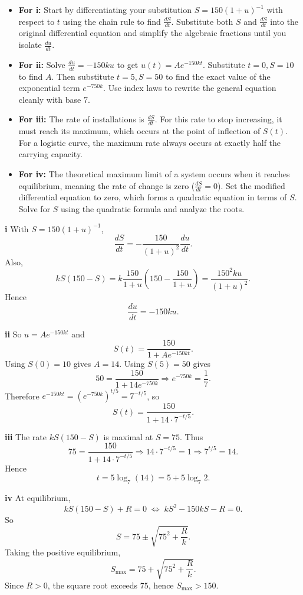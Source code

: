 \begin{hint}
\begin{itemize}
    \item \textbf{For i:} Start by differentiating your substitution $S = 150(1+u)^{-1}$ with respect to $t$ using the chain rule to find $\frac{dS}{dt}$. Substitute both $S$ and $\frac{dS}{dt}$ into the original differential equation and simplify the algebraic fractions until you isolate $\frac{du}{dt}$.
    \item \textbf{For ii:} Solve $\frac{du}{dt} = -150ku$ to get $u(t) = A e^{-150kt}$. Substitute $t=0, S=10$ to find $A$. Then substitute $t=5, S=50$ to find the exact value of the exponential term $e^{-750k}$. Use index laws to rewrite the general equation cleanly with base $7$.
    \item \textbf{For iii:} The rate of installations is $\frac{dS}{dt}$. For this rate to stop increasing, it must reach its maximum, which occurs at the point of inflection of $S(t)$. For a logistic curve, the maximum rate always occurs at exactly half the carrying capacity. 
    \item \textbf{For iv:} The theoretical maximum limit of a system occurs when it reaches equilibrium, meaning the rate of change is zero ($\frac{dS}{dt} = 0$). Set the modified differential equation to zero, which forms a quadratic equation in terms of $S$. Solve for $S$ using the quadratic formula and analyze the roots.
\end{itemize}
\end{hint}

\begin{solution}
\textbf{i} With $S=150(1+u)^{-1}$,
\[
\frac{dS}{dt}=-\frac{150}{(1+u)^2}\frac{du}{dt}.
\]
Also,
\[
kS(150-S)=k\frac{150}{1+u}\left(150-\frac{150}{1+u}\right)
=\frac{150^2ku}{(1+u)^2}.
\]
Hence
\[
\boxed{\frac{du}{dt}=-150ku}.
\]

\textbf{ii} So $u=Ae^{-150kt}$ and
\[
S(t)=\frac{150}{1+Ae^{-150kt}}.
\]
Using $S(0)=10$ gives $A=14$. Using $S(5)=50$ gives
\[
50=\frac{150}{1+14e^{-750k}}
\Rightarrow e^{-750k}=\frac17.
\]
Therefore $e^{-150kt}=(e^{-750k})^{t/5}=7^{-t/5}$, so
\[
\boxed{S(t)=\frac{150}{1+14\cdot 7^{-t/5}}}.
\]

\textbf{iii} The rate $kS(150-S)$ is maximal at $S=75$. Thus
\[
75=\frac{150}{1+14\cdot 7^{-t/5}}
\Rightarrow 14\cdot 7^{-t/5}=1
\Rightarrow 7^{t/5}=14.
\]
Hence
\[
\boxed{t=5\log_7(14)=5+5\log_7 2}.
\]

\textbf{iv} At equilibrium,
\[
kS(150-S)+R=0
\;\Longleftrightarrow\;
kS^2-150kS-R=0.
\]
So
\[
S=75\pm\sqrt{75^2+\frac{R}{k}}.
\]
Taking the positive equilibrium,
\[
\boxed{S_{\max}=75+\sqrt{75^2+\frac{R}{k}}}.
\]
Since $R>0$, the square root exceeds $75$, hence $S_{\max}>150$.
\end{solution}

